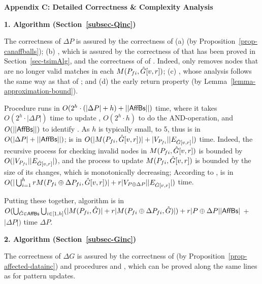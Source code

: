 

\vspace{1ex}
\noindent
{\large \textbf{Appendix C: Detailed Correctness \& Complexity Analysis}}
\label{sec-apd-complexity}

\noindent
{\textbf{1. Algorithm \incp (Section~\ref{subsec-Qinc})}}

The correctness of \incp \wrt $\Delta P$ is assured by
the correctness of (a) \identifyaffball (by Proposition~\ref{prop-canaffballs});
(b) \incmatch, which is assured by the correctness of \rgraphsim that has been proved in Section~\ref{sec-tsimAlg}, and the correctness of of \patedgeinsert. Indeed, \patedgeinsert only removes
nodes that are no longer valid matches in each $M(P_{fi}, \hat{G}{[v,r]})$;
(c) \comb, whose analysis follows the same way as that of \patedgeinsert; and
(d) the early return property (by Lemma~\ref{lemma-approximation-bound}).

\vspace{-1.5ex}
Procedure \identifyaffball runs in $O(2^{h}\cdot(|\Delta P|+h) +||{\mathsf{AffBs}}||)$ time, where it takes $O(2^{h}\cdot|\Delta P|)$ time to update \bfc, $O(2^{h}\cdot h)$ to do the AND-operation, and $O(||{\mathsf{AffBs}}||)$ to identify \affballsx.
As $h$ is typically small,  to 5, thus \identifyaffball is in $O(|\Delta P|+||{\mathsf{AffBs}}||)$;
\patedgeinsert is in $O(|M(P_{fi}, \hat{G}{[v,r]})|+|V_{P_{fi}}||E_{\hat{G}{[v,r]}}|)$ time.
Indeed, the recursive process for checking invalid nodes in $M(P_{fi}, \hat{G}{[v,r]})$ is bounded by $O(|V_{P_{fi}}||E_{\hat{G}{[v,r]}}|)$,
and the process to update $M(P_{fi}, \hat{G}{[v,r]})$ is bounded by the size of its changes, which is monotonically decreasing;
According to \patedgeinsert,
\comb is in $O(|\bigcup^{h}_{i=1} rM(P_{fi}\oplus\Delta P_{fi},\hat{G}{[v,r]})|+r|V_{P\oplus \Delta P}||E_{\hat{G}{[v,r]}}|)$ time.

\vspace{-1.5ex}
Putting these together, algorithm \incp is in
$O(\bigcup_{\hat{G}\in {\ensuremath {\mathsf{AffBs}}}}\bigcup_{i\in[1,h]}(|M(P_{fi}, \hat{G})|+r|M(P_{fi} \oplus \Delta P_{fi}, \hat{G})|) + r|P \oplus \Delta P||{\mathsf{AffBs}}|$ +$|\Delta P|)$ time \wrt $\Delta P$.


\noindent
{\textbf{2. Algorithm \incd (Section~\ref{subsec-Ginc})}}

The correctness of \incd \wrt $\Delta G$ is assured by the correctness of
\identifyaffball (by Proposition~\ref{prop-affected-datainc}) and procedures \incmatch and \comb,
which can be proved along the same lines as for pattern updates.

